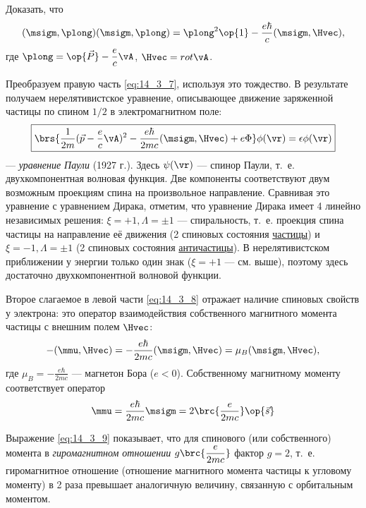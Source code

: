 \begin{excr}
Доказать, что
$$
(\msigm, \plong)(\msigm, \plong) = \plong^2 \op{1} - \frac{e\hbar}{c}(\msigm, \Hvec),
$$
где $\plong = \op{\vec{P}} - \dfrac{e}{c} \vA$, $\Hvec = rot \vA$.
\end{excr}

Преобразуем правую часть \eqref{eq:14_3_7}, используя это тождество. В результате получаем нерелятивистское уравнение, описывающее движение заряженной частицы по спином $1/2$ в электромагнитном поле:
\begin{equation}
\label{eq:14_3_8}
\boxed{\brs{\frac{1}{2m} (\vec{p} - \frac{e}{c} \vA)^2 - \frac{e\hbar}{2mc} (\msigm, \Hvec) + e\Phi}\phi(\vr) = \epsilon \phi(\vr)}
\end{equation}
--- {\em уравнение Паули} (1927 г.). Здесь $\psi(\vr)$ --- спинор Паули, т.~е. двухкомпонентная волновая функция. Две компоненты соответствуют двум возможным проекциям спина на произвольное направление. Сравнивая это уравнение с уравнением Дирака, отметим, что уравнение Дирака имеет 4 линейно независимых решения: $\xi = +1, \Lambda = \pm 1$ --- спиральность, т.~е. проекция спина частицы на направление её движения (2 спиновых состояния \underline{частицы}) и $\xi = -1, \Lambda = \pm 1$ (2 спиновых состояния \underline{античастицы}). В нерелятивистском приближении у энергии только один знак ($\xi = +1$ --- см. выше), поэтому здесь достаточно двухкомпонентной волновой функции.

Второе слагаемое в левой части \eqref{eq:14_3_8} отражает наличие спиновых свойств у электрона: это оператор взаимодействия собственного магнитного момента частицы с внешним полем $\Hvec$:
$$
- (\mmu, \Hvec) = - \frac{e\hbar}{2mc}(\msigm, \Hvec) = \mu_B (\msigm, \Hvec), 
$$
где $\mu_B = -\frac{e\hbar}{2mc}$ --- магнетон Бора ($e < 0$). Собственному магнитному моменту соответствует оператор
\begin{equation}
\label{eq:14_3_9}
\mmu = \frac{e\hbar}{2mc} \msigm = 2 \brc{\frac{e}{2mc}}\op{\vec{s}}
\end{equation}

Выражение \eqref{eq:14_3_9} показывает, что для спинового (или собственного) момента в {\em гиромагнитном отношении} $g\brc{\dfrac{e}{2mc}}$ фактор $g = 2$, т.~е. гиромагнитное отношение (отношение магнитного момента частицы к угловому моменту) в 2 раза превышает аналогичную величину, связанную с орбитальным моментом.

